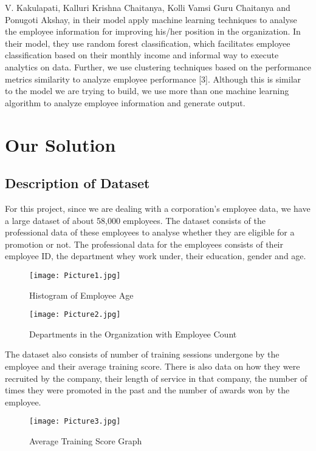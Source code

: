 \documentclass[11pt,conference]{IEEEtran}
\begin{document}
V. Kakulapati, Kalluri Krishna Chaitanya, Kolli Vamsi Guru Chaitanya and Ponugoti Akshay, in their model apply machine learning techniques to analyse the employee information for improving his/her position in the organization. In their model, they use random forest classification, which facilitates employee classification based on their monthly income and informal way to execute analytics on data. Further, we use clustering techniques based on the performance metrics similarity to analyze employee performance [3]. Although this is similar to the model we are trying to build, we use more than one machine learning algorithm to analyze employee information and generate output.

\section{Our Solution}
\subsection{Description of Dataset}
For this project, since we are dealing with a corporation’s employee data, we have a large dataset of about 58,000 employees. The dataset consists of the professional data of these employees to analyse whether they are eligible for a promotion or not. The professional data for the employees consists of their employee ID, the department whey work under, their education, gender and age.
\begin{figure}[htbp]
\centerline{\texttt{[image: Picture1.jpg]}}
\caption{Histogram of Employee Age}
\label{fig}
\end{figure}

\begin{figure}[htbp]
\centerline{\texttt{[image: Picture2.jpg]}}
\caption{Departments in the Organization with Employee Count}
\label{fig}
\end{figure}

The dataset also consists of number of training sessions undergone by the employee and their average training score. There is also data on how they were recruited by the company, their length of service in that company, the number of times they were promoted in the past and the number of awards won by the employee. 

\begin{figure}[htbp!]
\centerline{\texttt{[image: Picture3.jpg]}}
\caption{Average Training Score Graph}
\label{fig}
\end{figure}
\end{document}
